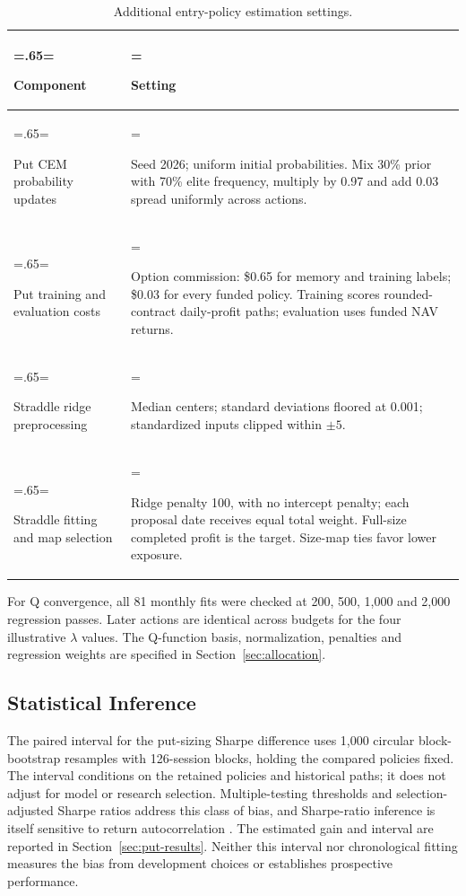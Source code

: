 \begin{table}[H]\centering\small
\caption{Additional entry-policy estimation settings.}\label{tab:additional-estimation-settings}
\setlength{\tabcolsep}{5pt}\renewcommand{\arraystretch}{1.2}
\begin{tabularx}{\textwidth}{@{}>{\hsize=.65\hsize\linewidth=\hsize\raggedright\arraybackslash}X>{\hsize=1.35\hsize\linewidth=\hsize\raggedright\arraybackslash}X@{}}\toprule
\textbf{Component} & \textbf{Setting}\\\midrule
Put CEM probability updates & Seed 2026; uniform initial probabilities. Mix 30\% prior with 70\% elite frequency, multiply by 0.97 and add 0.03 spread uniformly across actions.\\[5pt]
Put training and evaluation costs & Option commission: \$0.65 for memory and training labels; \$0.03 for every funded policy. Training scores rounded-contract daily-profit paths; evaluation uses funded NAV returns.\\[5pt]
Straddle ridge preprocessing & Median centers; standard deviations floored at 0.001; standardized inputs clipped within \(\pm5\).\\[5pt]
Straddle fitting and map selection & Ridge penalty 100, with no intercept penalty; each proposal date receives equal total weight. Full-size completed profit is the target. Size-map ties favor lower exposure.\\
\bottomrule\end{tabularx}\end{table}

For Q convergence, all 81 monthly fits were checked at 200, 500, 1,000 and 2,000 regression passes. Later actions are identical across budgets for the four illustrative \(\lambda\) values. The Q-function basis, normalization, penalties and regression weights are specified in Section~\ref{sec:allocation}.

\subsection{Statistical Inference}\label{app:statistical-inference}

The paired interval for the put-sizing Sharpe difference uses 1,000 circular block-bootstrap resamples \cite{politis1992circular} with 126-session blocks, holding the compared policies fixed. The interval conditions on the retained policies and historical paths; it does not adjust for model or research selection. Multiple-testing thresholds \cite{harvey2016cross} and selection-adjusted Sharpe ratios \cite{bailey2014deflated} address this class of bias, and Sharpe-ratio inference is itself sensitive to return autocorrelation \cite{lo2002statistics}. The estimated gain and interval are reported in Section~\ref{sec:put-results}. Neither this interval nor chronological fitting measures the bias from development choices or establishes prospective performance.
\FloatBarrier
